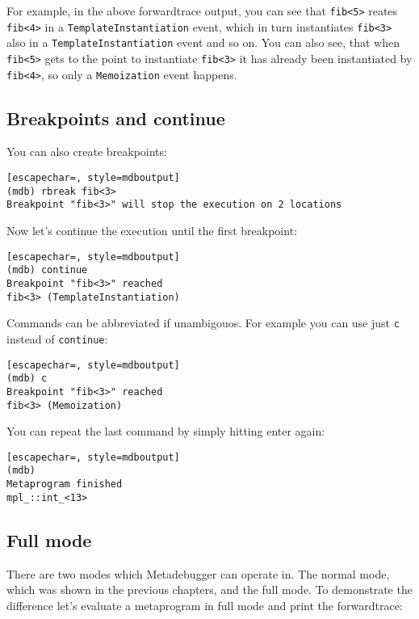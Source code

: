For example, in the above forwardtrace output, you can see that \texttt{fib<5>}
reates \texttt{fib<4>} in a \texttt{TemplateInstantiation} event, which in turn
instantiates \texttt{fib<3>} also in a \texttt{TemplateInstantiation} event and
so on.  You can also see, that when \texttt{fib<5>} gets to the point to
instantiate \texttt{fib<3>} it has already been instantiated by
\texttt{fib<4>}, so only a \texttt{Memoization} event happens.

\subsection{Breakpoints and continue}

You can also create breakpoints:

\begin{lstlisting}[escapechar=, style=mdboutput]
(mdb) rbreak fib<3>
Breakpoint "fib<3>" will stop the execution on 2 locations
\end{lstlisting}

Now let's continue the execution until the first breakpoint:

\begin{lstlisting}[escapechar=, style=mdboutput]
(mdb) continue
Breakpoint "fib<3>" reached
fib<3> (TemplateInstantiation)
\end{lstlisting}

Commands can be abbreviated if unambigouos. For example you can use just
\texttt{c} instead of \texttt{continue}:

\begin{lstlisting}[escapechar=, style=mdboutput]
(mdb) c
Breakpoint "fib<3>" reached
fib<3> (Memoization)
\end{lstlisting}

You can repeat the last command by simply hitting enter again:

\begin{lstlisting}[escapechar=, style=mdboutput]
(mdb)
Metaprogram finished
mpl_::int_<13>
\end{lstlisting}

\subsection{Full mode}

There are two modes which Metadebugger can operate in. The normal mode, which
was shown in the previous chapters, and the full mode. To demonstrate the
difference let's evaluate a metaprogram in full mode and print the
forwardtrace:

